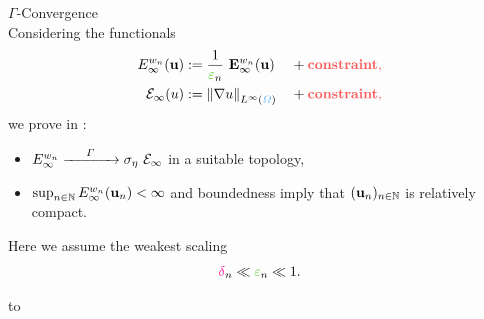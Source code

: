 \begin{minipage}[b][\midHeight][t]{\topWidth}%
{\color{BaseDarkColor} $\Gamma$-Convergence}\\%
%
Considering the functionals 
%
\begin{align*}
E_\infty^{w_n}(\vec u) &:= \frac{1}{\scaling_n}\ \vec E_\infty^{w_n}(\vec u)  &&+ \color{grape} \textbf{constraint},\\
\func_\infty(u) &:= \norm{\nabla u}_{L^\infty(\domain)}
&&+ \color{grape} \textbf{constraint},
\end{align*}
%
%
we prove in \cite{roith2022continuum}:
%
\begin{itemize}
\item $E_\infty^{w_n}\xrightarrow[]{\hspace*{.5cm}\Gamma\hspace*{.5cm}}
\sigma_\eta~\mathcal{E}_\infty$ in a suitable topology,
\item $\sup_{n\in\mathbb{N}}E_\infty^{w_n}(\mathbf{u}_n)<\infty$ and boundedness imply that $(\mathbf{u}_n)_{n\in\mathbb{N}}$ is relatively compact.
\end{itemize}
%
Here we assume the \alert{weakest scaling}%
\begin{align*}
\gres_n\ll\scaling_n\ll 1.
\end{align*}
\end{minipage}%

\begin{minipage}[t][\seplineHeight][b]{\textwidth}%
\vbox to \seplineHeight{%
\vfill%
\begin{center}%
\textcolor{sky}{%
\rule{\textwidth}{.2mm}}%
\end{center}%
\vfill%
}%
\end{minipage}%